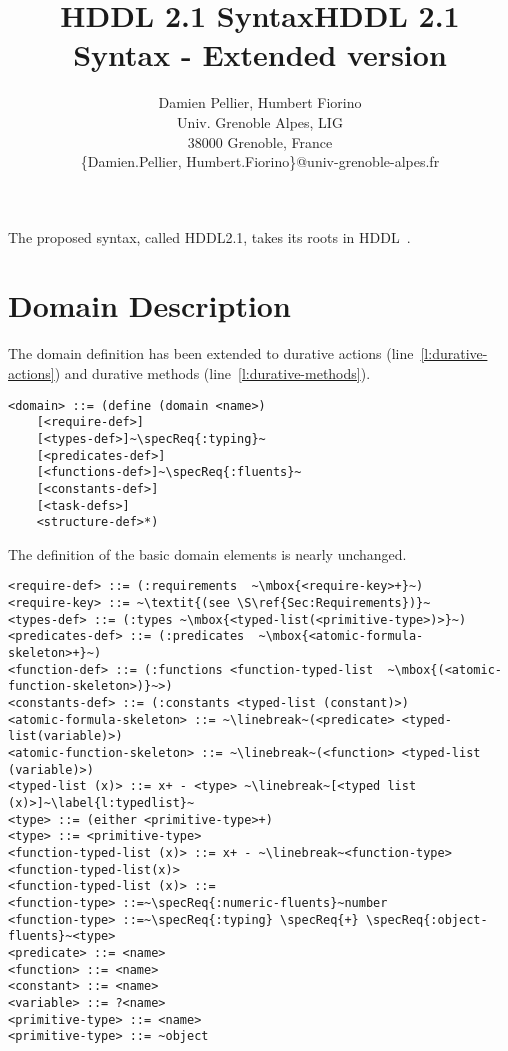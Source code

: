\documentclass[letterpaper]{article} %
\title{HDDL 2.1 Syntax}
\author{
Damien Pellier, Humbert Fiorino\\
Univ. Grenoble Alpes, LIG\\
38000 Grenoble, France\\
\{Damien.Pellier, Humbert.Fiorino\}@univ-grenoble-alpes.fr}
\title{HDDL 2.1 Syntax - Extended version}
\begin{document}
\maketitle


The proposed syntax, called HDDL2.1, takes its roots in HDDL~\citep{holler20}.

\section{Domain Description}

\newcommand{\specReq}[1]{\ensuremath{\mathtt{^{#1}}}}

The domain definition has been extended to durative actions (line~\ref{l:durative-actions}) and durative methods (line~\ref{l:durative-methods}).
\begin{lstlisting}[escapechar=~]
<domain> ::= (define (domain <name>)
    [<require-def>]
    [<types-def>]~\specReq{:typing}~
    [<predicates-def>]
    [<functions-def>]~\specReq{:fluents}~
    [<constants-def>]
    [<task-defs>]
    <structure-def>*)
\end{lstlisting}

%
%
%

\noindent The definition of the basic domain elements is nearly unchanged.

\begin{lstlisting}[firstnumber=last, escapechar=~]
<require-def> ::= (:requirements  ~\mbox{<require-key>+}~)
<require-key> ::= ~\textit{(see \S\ref{Sec:Requirements})}~
<types-def> ::= (:types ~\mbox{<typed-list(<primitive-type>)>}~)
<predicates-def> ::= (:predicates  ~\mbox{<atomic-formula-skeleton>+}~)
<function-def> ::= (:functions <function-typed-list  ~\mbox{(<atomic-function-skeleton>)}~>)
<constants-def> ::= (:constants <typed-list (constant)>)
<atomic-formula-skeleton> ::= ~\linebreak~(<predicate> <typed-list(variable)>)
<atomic-function-skeleton> ::= ~\linebreak~(<function> <typed-list (variable)>)
<typed-list (x)> ::= x+ - <type> ~\linebreak~[<typed list (x)>]~\label{l:typedlist}~
<type> ::= (either <primitive-type>+)
<type> ::= <primitive-type>
<function-typed-list (x)> ::= x+ - ~\linebreak~<function-type> <function-typed-list(x)>
<function-typed-list (x)> ::=
<function-type> ::=~\specReq{:numeric-fluents}~number
<function-type> ::=~\specReq{:typing} \specReq{+} \specReq{:object-fluents}~<type>
<predicate> ::= <name>
<function> ::= <name>
<constant> ::= <name>
<variable> ::= ?<name>
<primitive-type> ::= <name>
<primitive-type> ::= ~object
\end{lstlisting}
\end{document}
